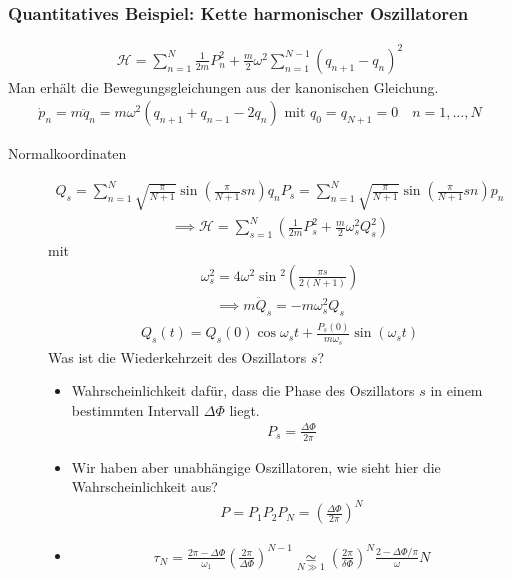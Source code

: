 \subsubsection*{Quantitatives Beispiel: Kette harmonischer Oszillatoren}
%
\begin{align*}
  \mathcal{H} = \sum_{n=1}^{N} \frac{1}{2m} P_n^2 + \frac{m}{2} \omega^2
  \sum_{n=1}^{N-1} \left( q_{n+1} - q_n \right)^2
\end{align*}
%
Man erhält die Bewegungsgleichungen aus der kanonischen Gleichung. 
%
\begin{align*}
  \dot{p}_n = m \ddot{q}_n = m \omega^2 (q_{n+1} + q_{n-1} - 2 q_n) \text{ mit }
  q_0 = q_{N+1} = 0 \quad n = 1, \ldots , N
\end{align*}
%
\begin{description}
  \item[Normalkoordinaten] %
  \begin{align*}
    Q_s = \sum_{n=1}^{N} \sqrt{\frac{\pi}{N+1}} \sin{\left( \frac{\pi}{N+1} s n \right)} q_n
    P_s = \sum_{n=1}^{N} \sqrt{\frac{\pi}{N+1}} \sin{\left( \frac{\pi}{N+1} s n \right)} p_n
  \end{align*}
  \begin{align*}
    \implies \mathcal{H} = \sum_{s=1}^{N} \left( \frac{1}{2m} P_s^2 + \frac{m}{2} \omega_s^2 Q_s^2 \right)
  \end{align*}
  mit
  \begin{align*}
    \omega_s^2 = 4 \omega^2 \sin{^2 \left( \frac{\pi s}{2(N+1)} \right)}
  \end{align*}
  \begin{align*}
    \implies m \ddot{Q}_s = - m \omega_s^2 Q_s
  \end{align*}
  \begin{align*}
    Q_s(t) = Q_s(0) \cos{\omega_s t} + \frac{P_s(0)}{m \omega_s} \sin{(\omega_s t)}
  \end{align*}
  Was ist die Wiederkehrzeit des Oszillators $s$?
  \begin{itemize}
    \item Wahrscheinlichkeit dafür, dass die Phase des Oszillators $s$ in einem 
      bestimmten Intervall $\Delta \Phi$ liegt.
      \begin{align*}
        P_s = \frac{\Delta \Phi}{2 \pi}
      \end{align*}
    \item Wir haben aber unabhängige Oszillatoren, wie sieht hier die Wahrscheinlichkeit aus?
      \begin{align*}
        P = P_1 P_2 P_N = \left( \frac{\Delta \Phi}{2 \pi} \right)^{N}
      \end{align*}
    \item
      \begin{align*}
        \tau_N = \frac{2 \pi - \Delta \Phi}{\omega_1} \left( \frac{2 \pi}{\Delta \Phi} \right)^{N-1}
        \underset{N \gg 1}{\simeq} \left( \frac{2 \pi}{\delta \Phi} \right)^{N} \frac{ 2  - \Delta \Phi / \pi}{ \omega } N
      \end{align*}
  \end{itemize}
\end{description}

